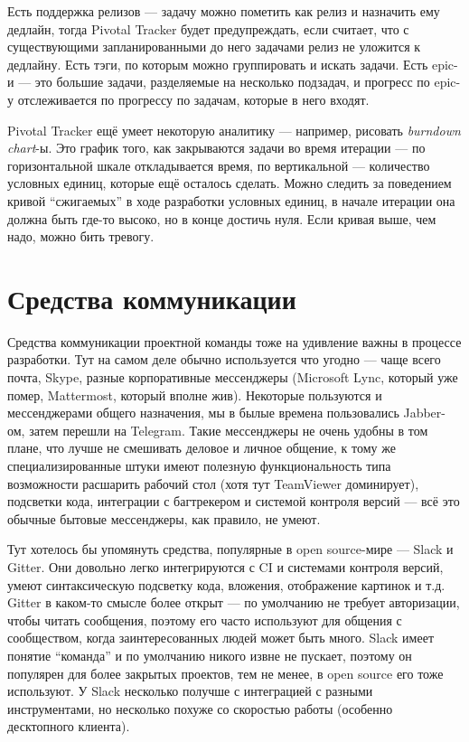 \documentclass[a5paper]{article}
\begin{document}
Есть поддержка релизов --- задачу можно пометить как релиз и назначить ему дедлайн, тогда Pivotal Tracker будет предупреждать, если считает, что с существующими запланированными до него задачами релиз не уложится к дедлайну. Есть тэги, по которым можно группировать и искать задачи. Есть epic-и --- это большие задачи, разделяемые на несколько подзадач, и прогресс по epic-у отслеживается по прогрессу по задачам, которые в него входят.

Pivotal Tracker ещё умеет некоторую аналитику --- например, рисовать \textit{burndown chart}-ы. Это график того, как закрываются задачи во время итерации --- по горизонтальной шкале откладывается время, по вертикальной --- количество условных единиц, которые ещё осталось сделать. Можно следить за поведением кривой ``сжигаемых'' в ходе разработки условных единиц, в начале итерации она должна быть где-то высоко, но в конце достичь нуля. Если кривая выше, чем надо, можно бить тревогу.

\section{Средства коммуникации}

Средства коммуникации проектной команды тоже на удивление важны в процессе разработки. Тут на самом деле обычно используется что угодно --- чаще всего почта, Skype, разные корпоративные мессенджеры (Microsoft Lync, который уже помер, Mattermost, который вполне жив). Некоторые пользуются и мессенджерами общего назначения, мы в былые времена пользовались Jabber-ом, затем перешли на Telegram. Такие мессенджеры не очень удобны в том плане, что лучше не смешивать деловое и личное общение, к тому же специализированные штуки имеют полезную функциональность типа возможности расшарить рабочий стол (хотя тут TeamViewer доминирует), подсветки кода, интеграции с багтрекером и системой контроля версий --- всё это обычные бытовые мессенджеры, как правило, не умеют.

Тут хотелось бы упомянуть средства, популярные в open source-мире --- Slack и Gitter. Они довольно легко интегрируются с CI и системами контроля версий, умеют синтаксическую подсветку кода, вложения, отображение картинок и т.д. Gitter в каком-то смысле более открыт --- по умолчанию не требует авторизации, чтобы читать сообщения, поэтому его часто используют для общения с сообществом, когда заинтересованных людей может быть много. Slack имеет понятие ``команда'' и по умолчанию никого извне не пускает, поэтому он популярен для более закрытых проектов, тем не менее, в open source его тоже используют. У Slack несколько получше с интеграцией с разными инструментами, но несколько похуже со скоростью работы (особенно десктопного клиента).
\end{document}
